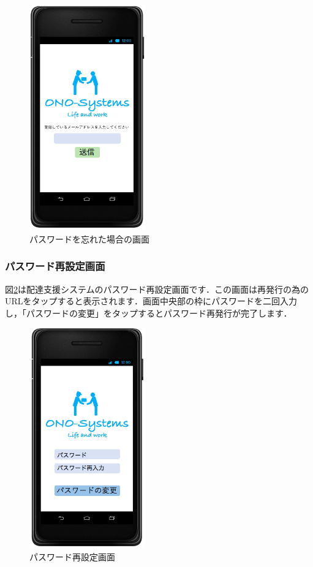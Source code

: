\documentclass[a4j,titlepage]{jarticle}
\begin{document}
\begin{figure}[H]
 \begin{center}
  \includegraphics[width=50mm]{ps_lost.png}
	\caption{パスワードを忘れた場合の画面}
	\label{fig:ps_lost}
 \end{center}

\end{figure}
\newpage
\subsubsection{パスワード再設定画面}
図\ref{fig:ps_change}は配達支援システムのパスワード再設定画面です．この画面は再発行の為のURLをタップすると表示されます．画面中央部の枠にパスワードを二回入力し，「パスワードの変更」をタップするとパスワード再発行が完了します．

\begin{figure}[H]
 \begin{center}
  \includegraphics[width=50mm]{ps_change.png}
	\caption{パスワード再設定画面}
	\label{fig:ps_change}
 \end{center}

\end{figure}
\newpage
\end{document}
